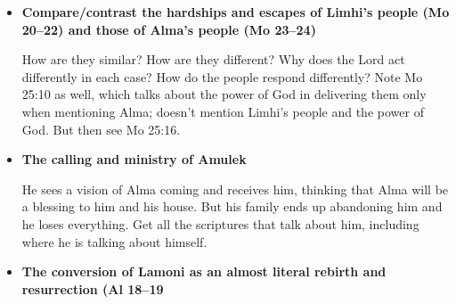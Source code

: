 \begin{itemize}
	Another good parallel: the boj's people had light the entire time, but for Nephi's group, their source of light was the Liahona, and it stopped working (18:12) until Nephi took charge again (18:21). Since they didn't have the light of the compass, they didn't know where to steer the ship, so they couldn't have even gotten there on their own if they had tried to fight the wind pushing against them.
	
	1N 17:3 kind of describes this situation: when we're righteous, the Lord prepares the way before us.
	
	So a few morals:

\item \textbf{Compare/contrast the hardships and escapes of Limhi's people (Mo 20--22) and those of Alma's people (Mo 23--24)}

	How are they similar? How are they different? Why does the Lord act differently in each case? How do the people respond differently? Note Mo 25:10 as well, which talks about the power of God in delivering them only when mentioning Alma; doesn't mention Limhi's people and the power of God. But then see Mo 25:16.

\item \textbf{The calling and ministry of Amulek}

	He sees a vision of Alma coming and receives him, thinking that Alma will be a blessing to him and his house. But his family ends up abandoning him and he loses everything. Get all the scriptures that talk about him, including where he is talking about himself.

\item \textbf{The conversion of Lamoni as an almost literal rebirth and resurrection (Al 18--19}


\end{itemize}

